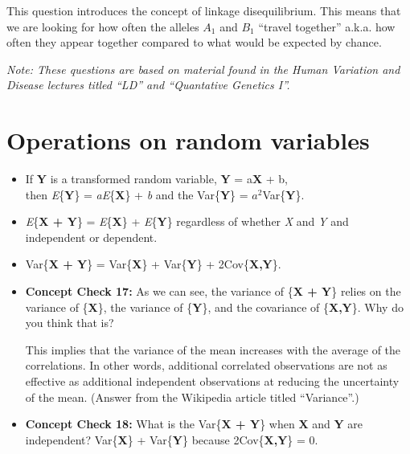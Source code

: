 \documentclass[12pt]{report}
\begin{document}
\begin{itemize}
\color{red} This question introduces the concept of linkage disequilibrium. This means that we are looking for how often the alleles \textit{$A_{1}$} and \textit{$B_{1}$} ``travel together'' a.k.a. how often they appear together compared to what would be expected by chance. 
\color{black}

\bigskip
\textit{Note: These questions are based on material found in the Human Variation and Disease lectures titled ``LD'' and ``Quantative Genetics I''.}


 \end{itemize}


\bigskip
\section{Operations on random variables}

\begin{itemize}

\item If \textbf{Y} is a transformed random variable, \textbf{Y} = a\textbf{X} + b, \\ 
then \textit{E}\{\textbf{Y}\} = \textit{aE}\{\textbf{X}\} + \textit{b} and the Var\{\textbf{Y}\} = $a^{2}$Var\{\textbf{Y}\}.

\item  \textit{E}\{\textbf{X + Y}\} = \textit{E}\{\textbf{X}\} + \textit{E}\{\textbf{Y}\} regardless of whether \textit{X} and \textit{Y} and independent or dependent. \\

\item Var\{\textbf{X + Y}\} = Var\{\textbf{X}\} + Var\{\textbf{Y}\} + 2Cov\{\textbf{X,Y}\}. \\

\item \textbf{Concept Check 17:} As we can see, the variance of \{\textbf{X + Y}\} relies on the variance of \{\textbf{X}\}, the variance of \{\textbf{Y}\}, and the covariance of \{\textbf{X,Y}\}. Why do you think that is? 


\color{red} This implies that the variance of the mean increases with the average of the correlations. In other words, additional correlated observations are not as effective as additional independent observations at reducing the uncertainty of the mean. (Answer from the Wikipedia article titled ``Variance''.)

\color{black}

\bigskip
\item \textbf{Concept Check 18:}  What is the Var\{\textbf{X + Y}\} when \textbf{X} and \textbf{Y} are independent? \color{red} Var\{\textbf{X}\} + Var\{\textbf{Y}\} because 2Cov\{\textbf{X,Y}\} = 0. \color{black}

\end{itemize}
\end{document}
